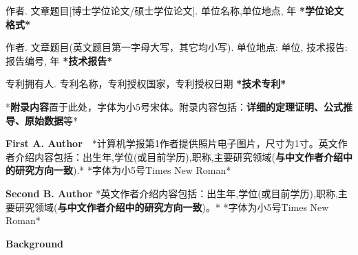 \documentclass[10.5pt,compsoc]{CjC}
\theoremstyle{mystyle}
\begin{document}
{\begin{thebibliography}{99}
  作者. 文章题目[博士学位论文/硕士学位论文]. 单位名称,单位地点, 年
  \textbf{*学位论文格式*}

  作者. 文章题目(英文题目第一字母大写，其它均小写). 单位地点: 单位,
  技术报告: 报告编号, 年 \textbf{*技术报告*}

  专利拥有人. 专利名称，专利授权国家，专利授权日期
  \textbf{*技术专利*}
\end{thebibliography}



{\setlength\parindent{2em}
*\textbf{附录内容}置于此处，字体为小5号宋体。附录内容包括：\textbf{详细的定理证明、公式推导、原始数据}等*}



\begin{biography}
\noindent
\textbf{First A. Author}\ \ *计算机学报第1作者提供照片电子图片，尺寸为1寸。英文作者介绍内容包括：出生年,学位(或目前学历),职称,主要研究领域(\textbf{与中文作者介绍中的研究方向一致}).*
*字体为小5号Times New Roman*

\end{biography}

\begin{biography}
\noindent
\textbf{Second B. Author} *英文作者介绍内容包括：出生年,学位(或目前学历),职称,主要研究领域(\textbf{与中文作者介绍中的研究方向一致})。*
*字体为小5号Times New Roman*
\end{biography}

\noindent \textbf{Background}


}
\end{document}
